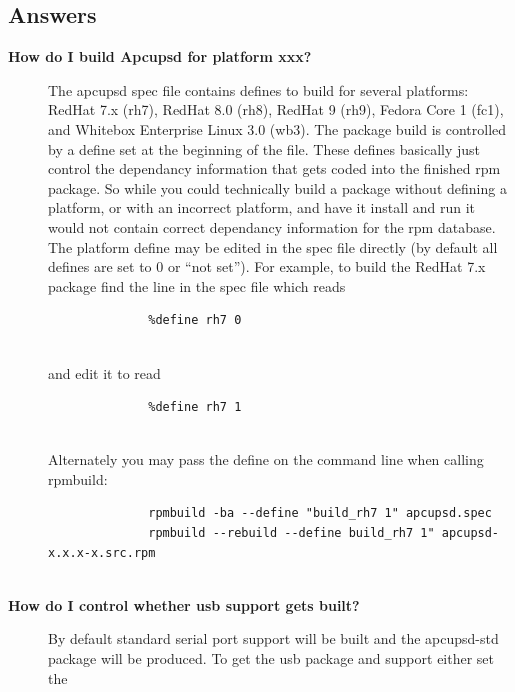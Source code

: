 {{{{{{{{{{{{{{{\label{Answers}

\subsection*{Answers}

\begin{description}

\item [{\bf How do I build Apcupsd for platform xxx?}]
   The apcupsd spec file contains defines to build for several platforms: RedHat
7.x (rh7), RedHat 8.0 (rh8), RedHat 9 (rh9), Fedora Core 1 (fc1), and Whitebox
Enterprise Linux 3.0 (wb3).  The package build is controlled by a define set
at the beginning of the file. These defines basically just control the
dependancy information that gets coded into the finished rpm package.  So
while you could technically build a package without defining a platform, or
with an incorrect platform, and have it install and run it would not contain
correct dependancy information for the rpm database.  The platform define may
be edited in the spec file directly (by default all defines are set to 0 or
``not set'').  For example, to build the RedHat 7.x package find the line in
the spec file which reads  

\footnotesize
\begin{verbatim}
              %define rh7 0
     
\end{verbatim}
\normalsize

and edit it to read  

\footnotesize
\begin{verbatim}
              %define rh7 1
     
\end{verbatim}
\normalsize

Alternately you may pass the define on the command line when calling rpmbuild:
 

\footnotesize
\begin{verbatim}
              rpmbuild -ba --define "build_rh7 1" apcupsd.spec
              rpmbuild --rebuild --define build_rh7 1" apcupsd-x.x.x-x.src.rpm
     
\end{verbatim}
\normalsize


\item [{\bf How do I control whether usb support gets built?}]
   By default standard serial port support will be built and the apcupsd-std
package will be produced. To get the usb package and support either set the  


\end{description}}}}}}}}}}}}}}}}

